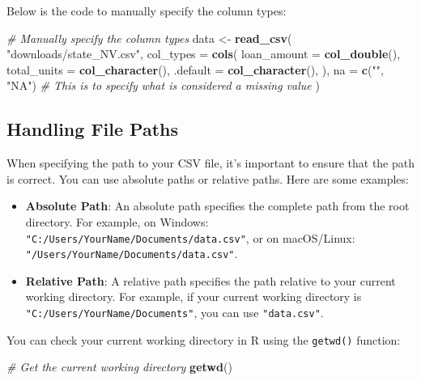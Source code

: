 \documentclass[
]{book}
\newenvironment{Shaded}{\begin{snugshade}}{\end{snugshade}}
\newcommand{\AttributeTok}[1]{\textcolor[rgb]{0.13,0.29,0.53}{#1}}
\newcommand{\CommentTok}[1]{\textcolor[rgb]{0.56,0.35,0.01}{\textit{#1}}}
\newcommand{\FunctionTok}[1]{\textcolor[rgb]{0.13,0.29,0.53}{\textbf{#1}}}
\newcommand{\NormalTok}[1]{#1}
\newcommand{\OtherTok}[1]{\textcolor[rgb]{0.56,0.35,0.01}{#1}}
\newcommand{\StringTok}[1]{\textcolor[rgb]{0.31,0.60,0.02}{#1}}
\providecommand{\tightlist}{%
  \setlength{\itemsep}{0pt}\setlength{\parskip}{0pt}}
\begin{document}
Below is the code to manually specify the column types:

\begin{Shaded}
\begin{Highlighting}[]
\CommentTok{\# Manually specify the column types}
\NormalTok{data }\OtherTok{\textless{}{-}} \FunctionTok{read\_csv}\NormalTok{(}
  \StringTok{"downloads/state\_NV.csv"}\NormalTok{,}
  \AttributeTok{col\_types =} \FunctionTok{cols}\NormalTok{(}
    \AttributeTok{loan\_amount =} \FunctionTok{col\_double}\NormalTok{(),}
    \AttributeTok{total\_units =} \FunctionTok{col\_character}\NormalTok{(),}
    \AttributeTok{.default =} \FunctionTok{col\_character}\NormalTok{(),}
\NormalTok{  ),}
  \AttributeTok{na =} \FunctionTok{c}\NormalTok{(}\StringTok{""}\NormalTok{, }\StringTok{"NA"}\NormalTok{) }\CommentTok{\# This is to specify what is considered a missing value}
\NormalTok{  )}
\end{Highlighting}
\end{Shaded}

\subsection{Handling File Paths}\label{handling-file-paths}

When specifying the path to your CSV file, it's important to ensure that the path is correct. You can use absolute paths or relative paths. Here are some examples:

\begin{itemize}
\tightlist
\item
  \textbf{Absolute Path}: An absolute path specifies the complete path from the root directory. For example, on Windows: \texttt{"C:/Users/YourName/Documents/data.csv"}, or on macOS/Linux: \texttt{"/Users/YourName/Documents/data.csv"}.
\item
  \textbf{Relative Path}: A relative path specifies the path relative to your current working directory. For example, if your current working directory is \texttt{"C:/Users/YourName/Documents"}, you can use \texttt{"data.csv"}.
\end{itemize}

You can check your current working directory in R using the \texttt{getwd()} function:

\begin{Shaded}
\begin{Highlighting}[]
\CommentTok{\# Get the current working directory}
\FunctionTok{getwd}\NormalTok{()}
\end{Highlighting}
\end{Shaded}
\end{document}
